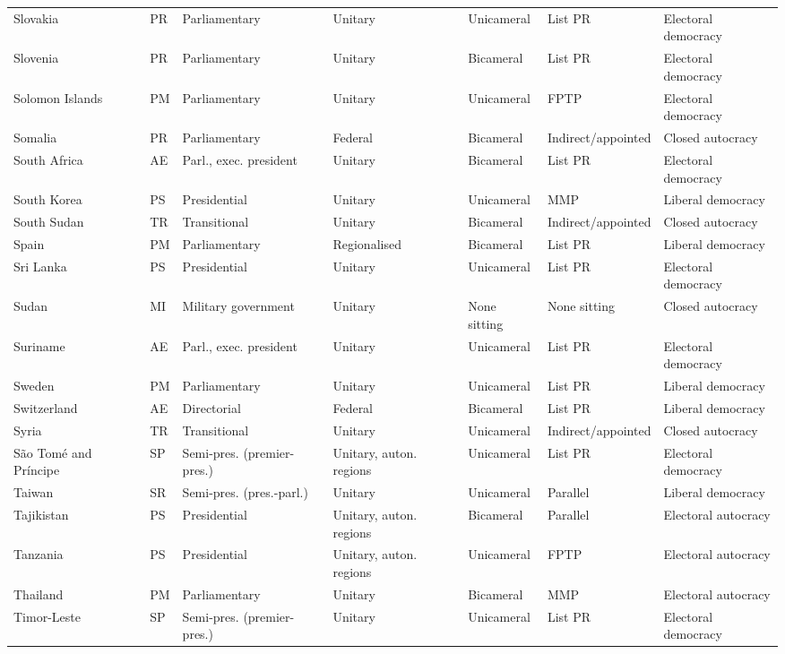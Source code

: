 \documentclass[11pt,a4paper]{article}
\begin{document}
{\begin{longtable}{p{2.9cm}lp{2.9cm}p{2.4cm}lp{1.9cm}p{2.0cm}}
Slovakia & PR & Parliamentary & Unitary & Unicameral & List PR & Electoral democracy\\
Slovenia & PR & Parliamentary & Unitary & Bicameral & List PR & Electoral democracy\\
Solomon Islands & PM & Parliamentary & Unitary & Unicameral & FPTP & Electoral democracy\\
Somalia & PR & Parliamentary & Federal & Bicameral & Indirect/appointed & Closed autocracy\\
South Africa & AE & Parl., exec. president & Unitary & Bicameral & List PR & Electoral democracy\\
South Korea & PS & Presidential & Unitary & Unicameral & MMP & Liberal democracy\\
South Sudan & TR & Transitional & Unitary & Bicameral & Indirect/appointed & Closed autocracy\\
Spain & PM & Parliamentary & Regionalised & Bicameral & List PR & Liberal democracy\\
Sri Lanka & PS & Presidential & Unitary & Unicameral & List PR & Electoral democracy\\
Sudan & MI & Military government & Unitary & None sitting & None sitting & Closed autocracy\\
Suriname & AE & Parl., exec. president & Unitary & Unicameral & List PR & Electoral democracy\\
Sweden & PM & Parliamentary & Unitary & Unicameral & List PR & Liberal democracy\\
Switzerland & AE & Directorial & Federal & Bicameral & List PR & Liberal democracy\\
Syria & TR & Transitional & Unitary & Unicameral & Indirect/appointed & Closed autocracy\\
São Tomé and Príncipe & SP & Semi-pres. (premier-pres.) & Unitary, auton. regions & Unicameral & List PR & Electoral democracy\\
Taiwan & SR & Semi-pres. (pres.-parl.) & Unitary & Unicameral & Parallel & Liberal democracy\\
Tajikistan & PS & Presidential & Unitary, auton. regions & Bicameral & Parallel & Electoral autocracy\\
Tanzania & PS & Presidential & Unitary, auton. regions & Unicameral & FPTP & Electoral autocracy\\
Thailand & PM & Parliamentary & Unitary & Bicameral & MMP & Electoral autocracy\\
Timor-Leste & SP & Semi-pres. (premier-pres.) & Unitary & Unicameral & List PR & Electoral democracy\\

\end{longtable}}
\end{document}
